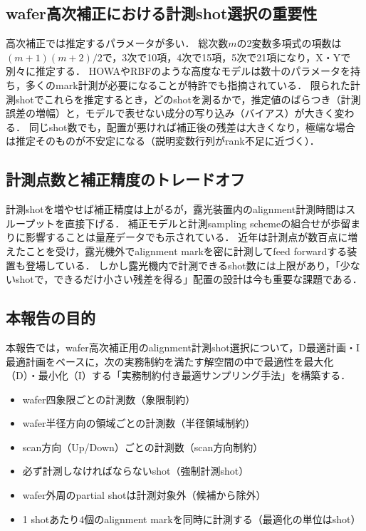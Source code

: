 \documentclass[10.5pt,a4paper]{ltjsarticle}
\begin{document}
\subsection{wafer高次補正における計測shot選択の重要性}

高次補正では推定するパラメータが多い．
総次数$m$の2変数多項式の項数は$(m+1)(m+2)/2$で，3次で10項，4次で15項，5次で21項になり，X・Yで別々に推定する．
HOWAやRBFのような高度なモデルは数十のパラメータを持ち，多くのmark計測が必要になることが特許でも指摘されている\cite{us9291916}．
限られた計測shotでこれらを推定するとき，どのshotを測るかで，推定値のばらつき（計測誤差の増幅）と，モデルで表せない成分の写り込み（バイアス）が大きく変わる．
同じshot数でも，配置が悪ければ補正後の残差は大きくなり，極端な場合は推定そのものが不安定になる（説明変数行列がrank不足に近づく）．

\subsection{計測点数と補正精度のトレードオフ}

計測shotを増やせば補正精度は上がるが，露光装置内のalignment計測時間はスループットを直接下げる．
補正モデルと計測sampling schemeの組合せが歩留まりに影響することは量産データでも示されている\cite{chiu2012}．
近年は計測点が数百点に増えたことを受け，露光機外でalignment markを密に計測してfeed forwardする装置も登場している\cite{canon_ms001,nikon_litho_booster}．
しかし露光機内で計測できるshot数には上限があり，「少ないshotで，できるだけ小さい残差を得る」配置の設計は今も重要な課題である．

\subsection{本報告の目的}

本報告では，wafer高次補正用のalignment計測shot選択について，D最適計画・I最適計画をベースに，次の実務制約を満たす解空間の中で最適性を最大化（D）・最小化（I）する「実務制約付き最適サンプリング手法」を構築する．

\begin{itemize}
  \item wafer四象限ごとの計測数（象限制約）
  \item wafer半径方向の領域ごとの計測数（半径領域制約）
  \item scan方向（Up/Down）ごとの計測数（scan方向制約）
  \item 必ず計測しなければならないshot（強制計測shot）
  \item wafer外周のpartial shotは計測対象外（候補から除外）
  \item 1 shotあたり4個のalignment markを同時に計測する（最適化の単位はshot）
\end{itemize}
\end{document}
